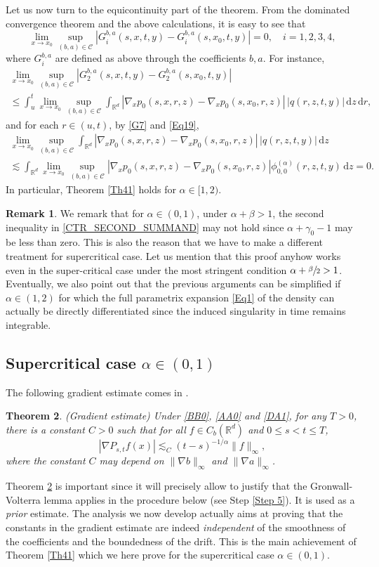 \documentclass[JEP,XML,SOM,Unicode,published]{cedram}
\theoremstyle{plain}
\newtheorem{theorem}{Theorem}[section]
\theoremstyle{definition}
\newtheorem{remark}[theorem]{Remark}
\newcommand\mR{\mathbb{R}}
\newcommand\1{{\mathbf{1}}}
\newcommand\sC{{\mathscr C}}
\newcommand{\dif}{\,\mathrm{d}}
\begin{document}
{Let us now turn to the equicontinuity part of the theorem. From}
the dominated convergence theorem {and} the above calculations,
it is easy to see that
\[
\lim_{x\to x_0}\sup_{(b,a)\in\sC}|G_i^{b,a}(s,x,t,y)-G_i^{b,a}(s,x_0,t,y)|=0,\quad i=1,2,3,4,
\]
where $G_i^{b,a}$ are defined as above through the coefficients $b,a$. For instance,
\begin{multline*}
\lim_{x\to x_0}\sup_{(b,a)\in\sC}|G_2^{b,a}(s,x,t,y)-G_2^{b,a}(s,x_0,t,y)|\\
\leq\int_{u}^{t}\lim_{x\to x_0} \sup_{(b,a)\in\sC}\int_{\mR^d}|\nabla_x {p}_0(s,x,r,z)-\nabla_x {p}_0(s,x_0,r,z)|\,|q(r,z,t,y)|\dif z \dif r,
\end{multline*}
and for each $r\in(u,t)$, by \eqref{G7} and \eqref{Eq19},
\begin{multline*}
\lim_{x\to x_0} \sup_{(b,a)\in\sC}\int_{\mR^d}|\nabla_x {p}_0(s,x,r,z)-\nabla_x {p}_0(s,x_0,r,z)|\,|q(r,z,t,y)|\dif z\\
\lesssim\int_{\mR^d}\lim_{x\to x_0} \sup_{(b,a)\in\sC}|\nabla_x {p}_0(s,x,r,z)-\nabla_x {p}_0(s,x_0,r,z)|\phi^{(\alpha)}_{0,0}(r,z,t,y)\dif z=0.
\end{multline*}
In particular, Theorem \ref{Th41} holds for $\alpha\in[1,2)$.
\begin{remark}
We remark that for $\alpha\in(0,1)$, under $\alpha+\beta>1$, the second inequality in \eqref{CTR_SECOND_SUMMAND}
may not hold since $\alpha+\gamma_0-1$ may be less than zero.
This is also the reason that we have to make a different treatment for supercritical case.
Let us mention that this proof anyhow works even in the super-critical case under the most stringent condition $\alpha+\sfrac \beta 2>1 $. Eventually, we also point out that the previous arguments can be simplified if $\alpha\in (1,2)$ for which the full parametrix expansion \eqref{Eq1} of the density can actually be directly differentiated since the induced singularity in time remains integrable.
\end{remark}
\subsection{Supercritical case $\alpha\in(0,1)$}
The following gradient estimate comes in \cite{Wa-Xu-Zh}.
\begin{theorem}\label{Le36}
(Gradient estimate) Under \eqref{BB0}, \eqref{AA0} and \eqref{DA1},
for any $T>0$,
there is a constant $C>0$ such that
for all $f\in C_b(\mR^d)$
and $0\leq s<t\leq T$,
\[
|\nabla P_{s,t}f(x)|\lesssim_C (t-s)^{-1/\alpha}\|f\|_\infty,
\]
where the constant $C$ may depend on $\|\nabla b\|_\infty$ and $\|\nabla a\|_\infty$.
\end{theorem}
{Theorem \ref{Le36} is important since it will precisely allow to justify that the Gronwall-Volterra lemma applies in the procedure below (see Step \ref{Step 5}). It is used as a \textit{prior} estimate. The analysis we now develop actually aims at proving that the constants in the gradient estimate are indeed \emph{independent} of the smoothness of the coefficients {and the boundedness of the drift}. This is the main achievement of Theorem \ref{Th41} which we here prove for the supercritical case $\alpha\in (0,1) $}.
\end{document}
